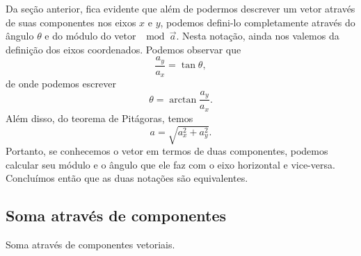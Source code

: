 Da seção anterior, fica evidente que além de podermos descrever um vetor através de suas componentes nos eixos $x$ e $y$, podemos defini-lo completamente através do ângulo $\theta$ e do módulo do vetor $\mod{\vec{a}}$. Nesta notação, ainda nos valemos da definição dos eixos coordenados. Podemos observar que
\begin{equation}
  \frac{a_y}{a_x} = \tan\theta,
\end{equation}
%
de onde podemos escrever
\begin{equation}
  \theta = \arctan\frac{a_y}{a_x}.
\end{equation}
%
Além disso, do teorema de Pitágoras, temos
\begin{equation}
  a = \sqrt{a_ x^2 + a_y^2}.
\end{equation}
%
Portanto, se conhecemos o vetor em termos de duas componentes, podemos calcular seu módulo e o ângulo que ele faz com o eixo horizontal e vice-versa. Concluímos então que as duas notações são equivalentes.

\subsection{Soma através de componentes}

\begin{marginfigure}
\centering
{}
\caption{Soma através de componentes vetoriais.\label{Fig:Soma_comp}}
\end{marginfigure}

